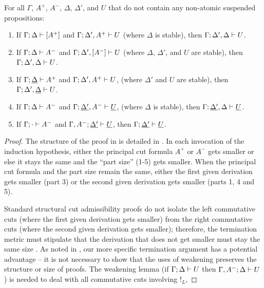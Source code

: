 \bigskip
\begin{theorem}\label{thm:lincut}
For all $\Gamma$, $A^+$, $A^-$, $\Delta$, $\Delta'$, and $U$ that
do not contain any non-atomic suspended propositions:
\begin{enumerate}
\item If ${\Gamma};{\Delta} \vdash {[A^+]} \mathstrut$
      and ${\Gamma};{\Delta',A^+} \vdash {U} \mathstrut$
      (where $\Delta$ is stable), 
      then ${\Gamma};{\Delta',\Delta} \vdash {U} \mathstrut$.
\item If ${\Gamma};{\Delta} \vdash {A^-} \mathstrut$
      and ${\Gamma};{\Delta', [A^-]} \vdash {U} \mathstrut$
      (where $\Delta$, $\Delta'$, and $U$ are stable),
      then ${\Gamma};{\Delta',\Delta} \vdash {U} \mathstrut$. 
\item If ${\Gamma};{\underline{\Delta}} \vdash {A^+} \mathstrut$
      and ${\Gamma};{\Delta', A^+} \vdash {U} \mathstrut$,
      (where $\Delta'$ and $U$ are stable),
      then ${\Gamma};{\Delta',\underline{\Delta}} \vdash {U} \mathstrut$. 
\item If ${\Gamma};{\Delta} \vdash {A^-} \mathstrut$
      and ${\Gamma};{\underline{\Delta'}, A^-} \vdash {\underline{U}} \mathstrut$,
      (where $\Delta$ is stable),
      then ${\Gamma};{\underline{\Delta'},\Delta} \vdash {\underline{U}} \mathstrut$. 
\item If ${\Gamma};{\cdot} \vdash {A^-} \mathstrut$
      and ${\Gamma, A^-};{\underline{\Delta'}} \vdash {\underline{U}} \mathstrut$,
      then ${\Gamma};{\underline{\Delta'}} \vdash {\underline{U}} \mathstrut$. 
\end{enumerate}
\end{theorem}

\begin{proof}
  The structure of the proof in is detailed in
  \cite{simmons12cut}.  In each invocation of the induction
  hypothesis, either the principal cut formula $A^+$ or $A^-$ gets
  smaller or else it stays the same and the ``part size'' (1-5) gets
  smaller. When the principal cut formula and the part size remain the
  same, either the first given derivation gets smaller (part 3)
  or the second given derivation gets smaller (parts 1, 4 and 5).

  Standard structural cut admissibility proofs do not isolate the left
  commutative cuts (where the first given derivation gets smaller)
  from the right commutative cuts (where the second given derivation
  gets smaller); therefore, the termination metric must stipulate that
  the derivation that does not get smaller must stay the same size
  \cite{pfenning00structural}. As noted in \cite{simmons11structural},
  our more specific termination argument has a potential advantage --
  it is not necessary to show that the uses of weakening preserves the
  structure or size of proofs. The weakening lemma (if
  ${\Gamma};{\Delta} \vdash {U} \mathstrut$ then ${\Gamma,
    A^-};{\Delta} \vdash {U} \mathstrut$) is needed to deal with all commutative cuts
  involving ${!}_L$,
\end{proof}

